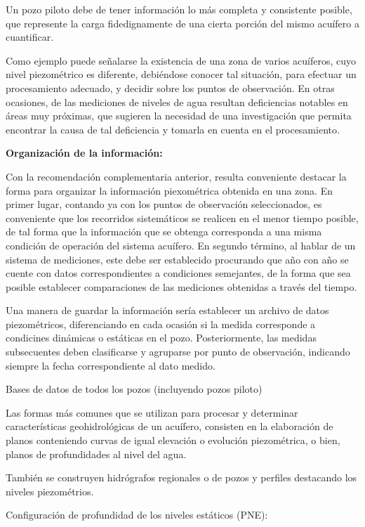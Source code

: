 Un pozo piloto debe de tener información lo más completa y consistente posible, que represente la carga fidedignamente de una cierta porción del mismo acuífero a cuantificar.

Como ejemplo puede señalarse la existencia de una zona de varios acuíferos, cuyo nivel piezométrico es diferente, debiéndose conocer tal situación, para efectuar un procesamiento adecuado, y decidir sobre los puntos de observación. En otras ocasiones, de las mediciones de niveles de agua resultan deficiencias notables en áreas muy próximas, que sugieren la necesidad de una investigación que permita encontrar la causa de tal deficiencia y tomarla en cuenta en el procesamiento.


\textbf{Organización de la información:}

Con la recomendación complementaria anterior, resulta conveniente destacar la forma para organizar la información piexométrica obtenida en una zona. En primer lugar, contando ya con los puntos de observación seleccionados, es conveniente que los recorridos sistemáticos se realicen en el menor tiempo posible, de tal forma que la información que se obtenga corresponda a una misma condición de operación del sistema acuífero. En segundo término, al hablar de un sistema de mediciones, este debe ser establecido procurando que año con año se cuente con datos correspondientes a condiciones semejantes, de la forma que sea posible establecer comparaciones de las mediciones obtenidas a través del tiempo.

Una manera de guardar la información sería establecer un archivo de datos piezométricos, diferenciando en cada ocasión si la medida corresponde a condicines dinámicas o estáticas en el pozo. Posteriormente, las medidas subsecuentes deben clasificarse y agruparse por punto de observación, indicando siempre la fecha correspondiente al dato medido.

Bases de datos de todos los pozos (incluyendo pozos piloto)

Las formas más comunes que se utilizan para procesar y determinar características geohidrológicas de un acuífero, consisten en la elaboración de planos conteniendo curvas de igual elevación o evolución piezométrica, o bien, planos de profundidades al nivel del agua.

También se construyen hidrógrafos regionales o de pozos y perfiles destacando los niveles piezométrios.

Configuración de profundidad de los niveles estáticos (PNE):


